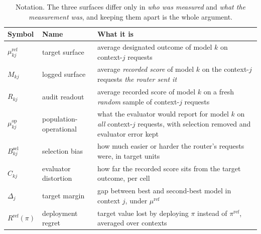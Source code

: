 \documentclass{article}
\theoremstyle{plain}
\theoremstyle{remark}
\newcommand{\muref}{\mu^{\mathrm{ref}}}
\newcommand{\muop}{\mu^{\mathrm{op}}}
\newcommand{\Bsel}{B^{\mathrm{sel}}}
\newcommand{\Rref}{R^{\mathrm{ref}}}
\newcommand{\piref}{\pi^{\mathrm{ref}}}
\begin{document}
\begin{table}[t]\centering\footnotesize\setlength{\tabcolsep}{5pt}
\caption{Notation. The three surfaces differ only in \emph{who was measured} and \emph{what the
measurement was}, and keeping them apart is the whole argument.}
\label{tab:notation}
\begin{tabular}{@{}llp{8.6cm}@{}}
\toprule
Symbol & Name & What it is\\
\midrule
$\muref_{kj}$ & target surface & average designated outcome of model $k$ on context-$j$ requests\\
$M_{kj}$ & logged surface & average \emph{recorded score} of model $k$ on the context-$j$ requests \emph{the router sent it}\\
$R_{kj}$ & audit readout & average recorded score of model $k$ on a fresh \emph{random} sample of context-$j$ requests\\
$\muop_{kj}$ & population-operational & what the evaluator would report for model $k$ on \emph{all} context-$j$ requests, with selection removed and evaluator error kept\\
$\Bsel_{kj}$ & selection bias & how much easier or harder the router's requests were, in target units\\
$C_{kj}$ & evaluator distortion & how far the recorded score sits from the target outcome, per cell\\
$\Delta_j$ & target margin & gap between best and second-best model in context $j$, under $\muref$\\
$\Rref(\pi)$ & deployment regret & target value lost by deploying $\pi$ instead of $\piref$, averaged over contexts\\
\bottomrule
\end{tabular}
\end{table}
\end{document}
